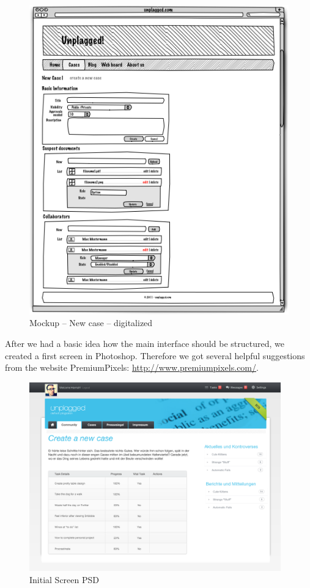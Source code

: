 \begin{figure}[htbp]
  \centering
    \includegraphics[bb = 0 150 410 560,clip]{mockups/1_new_case.png}
  \caption{Mockup – New case – digitalized}
  \label{fig:1newCaseMockup}
\end{figure}


After we had a basic idea how the main interface should be structured, we created a first screen in Photoshop. Therefore we got several helpful suggestions from the website PremiumPixels: \url{http://www.premiumpixels.com/}.

\begin{figure}[htbp]
  \centering
    \includegraphics[width=0.97\textwidth]{images/init-psd.png}
  \caption{Initial Screen PSD}
  \label{fig:initialScreenPsd}
\end{figure}

